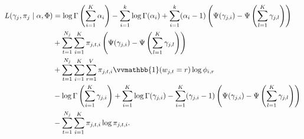 \documentclass[11pt]{article}
\newcommand{\indicator}{\vvmathbb{1}}
\begin{document}
\begin{equation}
  \begin{split}
    L(\gamma_j, \pi_j \mid \alpha, \Phi)
    &=
    \log \Gamma\left(\sum_{i=1}^K \alpha_i\right)
    - \sum_{i=1}^k \log \Gamma(\alpha_i)
    + \sum_{i=1}^k (\alpha_i - 1)
    \left(\Psi(\gamma_{j,i}) - \Psi\left(\sum_{l=1}^K \gamma_{j,l}\right)\right)
    \\&+
    \sum_{t=1}^{N_j} \sum_{i=1}^K \pi_{j,t,i}
    \left(\Psi(\gamma_{j,i}) - \Psi\left(\sum_{l=1}^K \gamma_{j,l}\right)\right)
    \\&+
    \sum_{t=1}^{N_j} \sum_{i=1}^K \sum_{r=1}^V
    \pi_{j,t,i} \indicator(w_{j,t} = r) \log \phi_{i,r}
    \\&-
    \log \Gamma\left(\sum_{i=1}^K \gamma_{j,i}\right)
    + \sum_{i=1}^K \log \Gamma(\gamma_{j,i})
    - \sum_{i=1}^K (\gamma_{j,i} - 1)
    \left(\Psi(\gamma_{j,i}) - \Psi\left(\sum_{l=1}^K \gamma_{j,l}\right)\right)
    \\&-
    \sum_{t=1}^{N_j} \sum_{i=1}^K
    \pi_{j,t,i} \log \pi_{j,t,i}.
  \end{split}
\end{equation}
\end{document}
